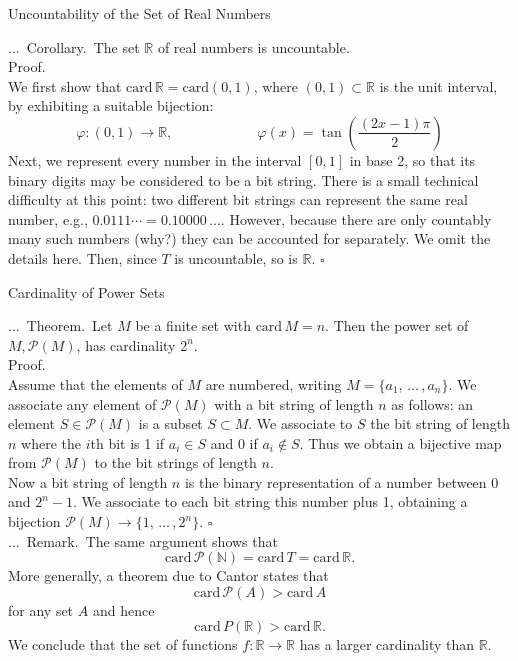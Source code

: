 \documentclass[smaller,hyperref={CJKbookmarks=true}]{beamer}
\newcommand{\N}{\mathbb{N}} \newcommand{\Z}{\mathbb{Z}} \newcommand{\Q}{\mathbb{Q}}
\newcommand{\R}{\mathbb{R}}
\newenvironment{PROOF}{{\noindent\!\sf\alert{Proof.}}\\}{\hfill$\square$\\}
\newcounter{zhuo}[subsection]
\renewcommand{\thezhuo}{\thesection.\thesubsection.\arabic{zhuo}}
\newenvironment{REMARK}{\stepcounter{zhuo}\alert{\thezhuo.~Remark.\,}}{}
\newenvironment{COROLLARY}{\stepcounter{zhuo}\alert{\thezhuo.~Corollary.\,}}{}
\newenvironment{THEOREM}{\stepcounter{zhuo}\alert{\thezhuo.~Theorem.\,}}{}
\begin{document}
\begin{frame}[t]{Uncountability of the Set of Real Numbers}
\begin{spacing}{1.1}
\begin{COROLLARY}
The set $\R$ of real numbers is uncountable.\\[4pt]
\end{COROLLARY}
\begin{PROOF}
We first show that $\text{card}\,\R=\text{card}(0,1)$, where $(0,1)\subset\R$ is the unit interval, by exhibiting a suitable bijection:
\[\varphi\!:(0,1)\to\R,\qquad\qquad\qquad
\varphi(x)=\tan\left(\frac{(2x-1)\pi}{2}\right)\]
Next, we represent every number in the interval $[0,1]$ in base 2, so that its binary digits may be considered to be a bit string. There is a small
technical difficulty at this point: two different bit strings can represent the
same real number, e.g., $0.0111\cdots=0.10000\,....$ However, because there are only countably many such numbers (why?) they can be accounted for
separately. We omit the details here. Then, since $T$ is uncountable, so is
$\R$.
\end{PROOF}
\end{spacing}
\end{frame}
\begin{frame}{Cardinality of Power Sets}
\begin{spacing}{1.2}
\begin{THEOREM}
Let $M$ be a finite set with $\text{card}\,M=n$. Then the power set of $M,\mathcal{P}(M)$, has cardinality $2^n$.\\[5pt]
\end{THEOREM}
\begin{PROOF}
Assume that the elements of $M$ are numbered, writing $M=\{a_1,\,...\,,a_n\}$. We associate any element of $\mathcal{P}(M)$ with a bit string of length $n$ as follows: an element $S\in\mathcal{P}(M)$ is a subset $S\subset M$. We associate to $S$ the bit string of length $n$ where the $i$th bit is 1 if $a_i\in S$ and 0 if $a_i\notin S$. Thus we obtain a bijective map from $\mathcal{P}(M)$ to the bit strings of length $n$.\\[6pt]
Now a bit string of length $n$ is the binary representation of a number between 0 and $2^n-1$. We associate to each bit string this number plus 1, obtaining a bijection $\mathcal{P}(M)\to\{1,\,...\,,2^n\}$.
\end{PROOF}
\newpage
\begin{REMARK}
The same argument shows that
\[\text{card}\,\mathcal{P}(\N)=\text{card}\,T=\text{card}\,\R.\]
More generally, a theorem due to Cantor states that
\[\text{card}\,\mathcal{P}(A)>\text{card}\,A\]
for any set $A$ and hence
\[\text{card}\,P(\R)>\text{card}\,\R.\]
We conclude that the set of functions $f:\R\to\R$ has a larger cardinality than $\R$.
\end{REMARK}
\end{spacing}
\end{frame}
\end{document}
